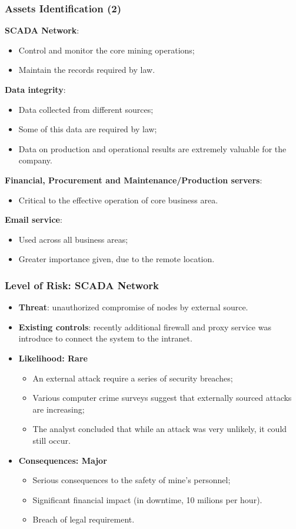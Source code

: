 \documentclass[xcolor ={table,usenames,dvipsnames}]{beamer}
\theoremstyle{definition}
\begin{document}
	\begin{frame}
		\frametitle{Assets Identification (2)}
		\textbf{SCADA Network}:
		\begin{itemize}
			\item Control and monitor the core mining operations;
			\item Maintain the records required by law.
		\end{itemize}
		\textbf{Data integrity}:
		\begin{itemize}
			\item Data collected from different sources;
			\item Some of this data are required by law;
			\item Data on production and operational results are extremely valuable for the company.
		\end{itemize}
		\textbf{Financial, Procurement and Maintenance/Production servers}:
		\begin{itemize}
			\item Critical to the effective operation of core business area.
		\end{itemize}
		\textbf{Email service}:
		\begin{itemize}
			\item Used across all business areas;
			\item Greater importance given, due to the remote location.
		\end{itemize}
	\end{frame}

	\begin{frame}
		\frametitle{Level of Risk: SCADA Network}
		\begin{itemize}
			\item \textbf{Threat}: unauthorized compromise of nodes by external source.
			\item \textbf{Existing controls}: recently additional firewall and proxy service was introduce to connect the system to the intranet.
			\item \textbf{Likelihood: Rare}
			\begin{itemize}
				\item An external attack require a series of security breaches;
				\item Various computer crime surveys suggest that externally sourced attacks are increasing;
				\item The analyst concluded that while an attack was
				very unlikely, it could still occur.
			\end{itemize}
			\item \textbf{Consequences: Major}
			\begin{itemize}
				\item Serious consequences to the safety of mine's personnel;
				\item Significant financial impact (in downtime, 10 milions per hour).
				\item Breach of legal requirement.
			\end{itemize}
		\end{itemize}
	\end{frame}
	
\end{document}
